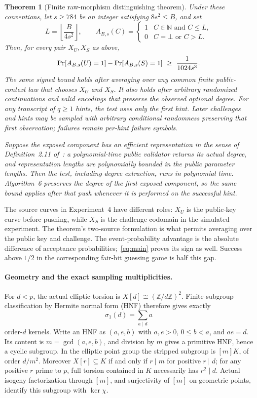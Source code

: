 \documentclass[11pt]{article}
\newtheorem{theorem}{Theorem}
\newcommand{\Prob}{\mathop{\rm Pr}}
\newcommand{\N}{\mathbb N}
\newcommand{\Z}{\mathbb Z}
\begin{document}
\begin{theorem}[Finite raw-morphism distinguishing theorem]\label{thm:finite}
Under these conventions, let $s\ge784$ be an integer satisfying $8s^2\le B$, and set
\[
 L=\left\lfloor\frac{B}{4s^2}\right\rfloor,\qquad
 A_{B,s}(C)=\begin{cases}1&C\in\N\text{ and }C\le L,\\0&C=\bot\text{ or }C>L.\end{cases}
\]
Then, for every pair $X_U,X_S$ as above,
\begin{equation}\label{eq:main}
 \Prob[A_{B,s}(U)=1]-\Prob[A_{B,s}(S)=1]
 \ \ge\ \frac1{1024s^3}.
\end{equation}
The same signed bound holds after averaging over any common finite public-context
law that chooses $X_U$ and $X_S$. It also holds after arbitrary randomized
continuations and valid encodings that preserve the observed optional degree.
For any transcript of $q\ge1$ hints, the test uses only the first hint. Later
challenges and hints may be sampled with arbitrary conditional randomness
preserving that first observation; failures remain per-hint failure symbols.

Suppose the exposed component has an efficient representation in the sense of
Definition~2.11 of~\cite{proof}: a polynomial-time public validator returns its
actual degree, and representation lengths are polynomially bounded in the public
parameter lengths. Then the test, including degree extraction, runs in polynomial
time. Algorithm~6 preserves the degree of the first exposed component, so the same
bound applies after that push whenever it is performed on the successful hint.
\end{theorem}

The source curves in Experiment~4 have different roles: $X_U$ is the public-key
curve before pushing, while $X_S$ is the challenge codomain in the simulated
experiment. The theorem's two-source formulation is what permits averaging over
the public key and challenge. The event-probability advantage is the absolute
difference of acceptance probabilities;~\eqref{eq:main} proves its sign as well.
Success above $1/2$ in the corresponding fair-bit guessing game is half this gap.

\paragraph{Geometry and the exact sampling multiplicities.}
For $d<p$, the actual elliptic torsion is
$X[d]\cong(\Z/d\Z)^2$. Finite-subgroup classification by Hermite normal form (HNF)
therefore gives exactly
\[
 \sigma_1(d)=\sum_{a\mid d}a
\]
order-$d$ kernels. Write an HNF as $(a,e,b)$ with $a,e>0$, $0\le b<a$, and
$ae=d$. Its content is $m=\gcd(a,e,b)$, and division by $m$ gives a primitive
HNF, hence a cyclic subgroup. In the elliptic point group the stripped subgroup
is $[m]K$, of order $d/m^2$. Moreover $X[r]\subseteq K$ if and only if $r\mid m$
for positive $r\mid d$; for any positive $r$ prime to $p$, full torsion
contained in $K$ necessarily has $r^2\mid d$. Actual isogeny factorization through $[m]$, and surjectivity of
$[m]$ on geometric points, identify this subgroup with $\ker\chi$.
\end{document}
